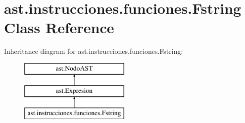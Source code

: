 \hypertarget{classast_1_1instrucciones_1_1funciones_1_1_fstring}{}\section{ast.\+instrucciones.\+funciones.\+Fstring Class Reference}
\label{classast_1_1instrucciones_1_1funciones_1_1_fstring}
Inheritance diagram for ast.\+instrucciones.\+funciones.\+Fstring\+:\begin{figure}[H]
\begin{center}
\leavevmode
\includegraphics[height=3.000000cm]{classast_1_1instrucciones_1_1funciones_1_1_fstring}
\end{center}
\end{figure}
